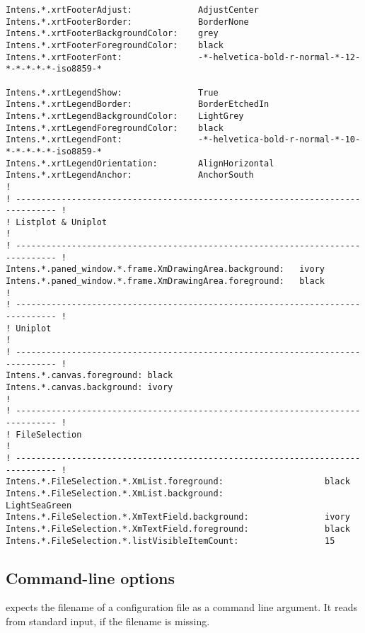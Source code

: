 {\begin{verbatim}
Intens.*.xrtFooterAdjust:             AdjustCenter
Intens.*.xrtFooterBorder:             BorderNone
Intens.*.xrtFooterBackgroundColor:    grey
Intens.*.xrtFooterForegroundColor:    black
Intens.*.xrtFooterFont:               -*-helvetica-bold-r-normal-*-12-*-*-*-*-*-iso8859-*

Intens.*.xrtLegendShow:               True
Intens.*.xrtLegendBorder:             BorderEtchedIn
Intens.*.xrtLegendBackgroundColor:    LightGrey
Intens.*.xrtLegendForegroundColor:    black
Intens.*.xrtLegendFont:               -*-helvetica-bold-r-normal-*-10-*-*-*-*-*-iso8859-*
Intens.*.xrtLegendOrientation:        AlignHorizontal
Intens.*.xrtLegendAnchor:             AnchorSouth
!
! ------------------------------------------------------------------------------ !
! Listplot & Uniplot                                                             !
! ------------------------------------------------------------------------------ !
Intens.*.paned_window.*.frame.XmDrawingArea.background:   ivory
Intens.*.paned_window.*.frame.XmDrawingArea.foreground:   black
!
! ------------------------------------------------------------------------------ !
! Uniplot                                                                        !
! ------------------------------------------------------------------------------ !
Intens.*.canvas.foreground: black
Intens.*.canvas.background: ivory
!
! ------------------------------------------------------------------------------ !
! FileSelection                                                                  !
! ------------------------------------------------------------------------------ !
Intens.*.FileSelection.*.XmList.foreground:                    black
Intens.*.FileSelection.*.XmList.background:                    LightSeaGreen
Intens.*.FileSelection.*.XmTextField.background:               ivory
Intens.*.FileSelection.*.XmTextField.foreground:               black
Intens.*.FileSelection.*.listVisibleItemCount:                 15
\end{verbatim}
}
%
\subsection{Command-line options}
\label{sec:cl-options}
\INTENS{} expects the filename of a configuration file as a command line argument.
It reads from standard input, if the filename is missing.

